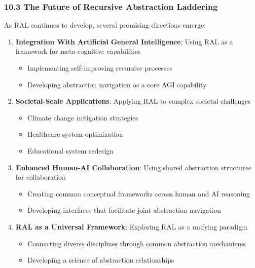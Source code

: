 \documentclass[
]{article}
\providecommand{\tightlist}{%
  \setlength{\itemsep}{0pt}\setlength{\parskip}{0pt}}
\begin{document}
\subsubsection{10.3 The Future of Recursive Abstraction
Laddering}\label{the-future-of-recursive-abstraction-laddering}

As RAL continues to develop, several promising directions emerge:

\begin{enumerate}
\def\labelenumi{\arabic{enumi}.}
\tightlist
\item
  \textbf{Integration With Artificial General Intelligence}: Using RAL
  as a framework for meta-cognitive capabilities

  \begin{itemize}
  \tightlist
  \item
    Implementing self-improving recursive processes
  \item
    Developing abstraction navigation as a core AGI capability
  \end{itemize}
\item
  \textbf{Societal-Scale Applications}: Applying RAL to complex societal
  challenges

  \begin{itemize}
  \tightlist
  \item
    Climate change mitigation strategies
  \item
    Healthcare system optimization
  \item
    Educational system redesign
  \end{itemize}
\item
  \textbf{Enhanced Human-AI Collaboration}: Using shared abstraction
  structures for collaboration

  \begin{itemize}
  \tightlist
  \item
    Creating common conceptual frameworks across human and AI reasoning
  \item
    Developing interfaces that facilitate joint abstraction navigation
  \end{itemize}
\item
  \textbf{RAL as a Universal Framework}: Exploring RAL as a unifying
  paradigm

  \begin{itemize}
  \tightlist
  \item
    Connecting diverse disciplines through common abstraction mechanisms
  \item
    Developing a science of abstraction relationships
  \end{itemize}
\end{enumerate}
\end{document}
